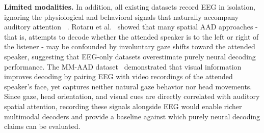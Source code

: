 \documentclass{article}
\begin{document}
\textbf{Limited modalities.} In addition, all existing datasets record EEG in isolation, ignoring the physiological and behavioral signals that naturally accompany auditory attention ~\cite{geirnaert2021, rotaru2024, golumbic2013, hendrikse2019, geirnaert2024}. Rotaru et al.~\cite{rotaru2024} showed that many spatial AAD approaches - that is, attempts to decode whether the attended speaker is to the left or
right of the listener - may be confounded by involuntary gaze shifts
toward the attended speaker, suggesting that EEG-only datasets overestimate
purely neural decoding performance. The MM-AAD dataset~\cite{mmaad2025} demonstrated that visual information improves decoding by pairing EEG with video recordings of the attended
speaker's face, yet captures neither natural gaze behavior nor head movements. 
Since gaze, head orientation, and visual cues are
directly correlated with auditory spatial attention, recording these signals
alongside EEG would enable richer multimodal decoders and provide a
baseline against which purely neural decoding claims can be
evaluated. 


\begin{table}[htbp]
\centering
\caption{Comparison of notable AAD datasets. ``Modalities'' refers to data
streams beyond EEG. ``Speakers'' denotes the number of competing speech
sources.}
\label{tab:comparison}
\end{table}
\end{document}
